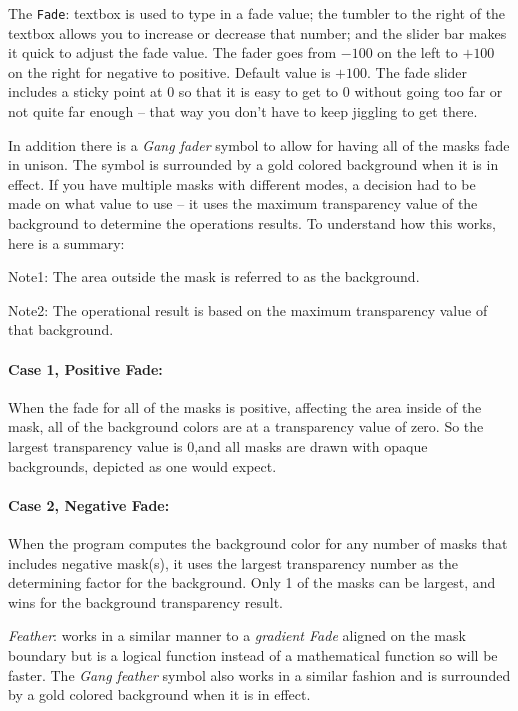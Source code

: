 The \texttt{Fade}: textbox is used to type in a fade value; the tumbler to the right of the textbox allows you to increase or decrease that number; and the slider bar makes it quick to adjust the fade value.  The fader goes from $-100$ on the left to $+100$ on the right for negative to positive.  Default value is $+100$. The fade slider includes a sticky point at 0 so that it is easy to get to 0 without going too far or not quite far enough -- that way you don’t have to keep jiggling to get there. 

In addition there is a \textit{Gang fader} symbol to allow for having all of the masks fade in unison. The symbol is surrounded by a gold colored background when it is in effect.  If you have multiple masks with different modes, a decision had to be made on what value to use -- it uses the maximum transparency value of the background to determine the operations results.  To understand how this works, here is a summary:

Note1: The area outside the mask is referred to as the background.

Note2: The operational result is based on the maximum transparency value of that background.

\paragraph{Case 1, Positive Fade:} When the fade for all of the masks is positive, affecting the area inside of the mask, all of the
background colors are at a transparency value of zero. So the largest transparency value is 0,and all masks are drawn with opaque backgrounds, depicted as one would expect.

\paragraph{Case 2, Negative Fade:} When the program computes the background color for any number of masks that includes negative
mask(s), it uses the largest transparency number as the determining factor for the background. Only 1 of the masks can be largest, and wins for the background transparency result.

\vspace{3ex}\textit{Feather}: works in a similar manner to a \textit{gradient Fade} aligned on the mask boundary but is a logical function instead of a mathematical function so will be faster.  The \textit{Gang feather} symbol also works in a similar fashion and is surrounded by a gold colored background when it is in effect.

